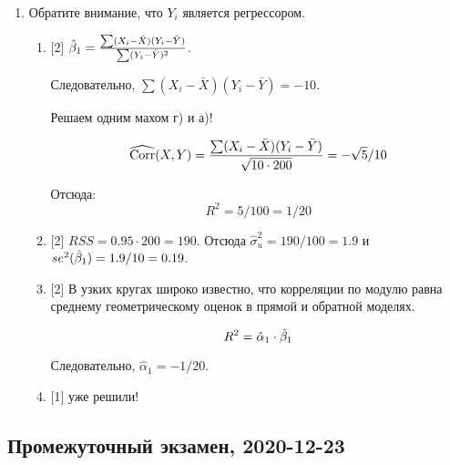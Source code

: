 \begin{enumerate}
\item Обратите внимание, что $Y_i$ является регрессором. 
\begin{enumerate}
    \item {[2]} $\hat{\beta}_1 = \frac{\sum (X_i - \bar X)(Y_i - \bar Y)}{\sum (Y_i - \bar Y)^2}$.

    Следовательно, $\sum (X_i - \bar X)(Y_i - \bar Y) = -10$. 

    Решаем одним махом г) и а)!

    \[
    \operatorname{\widehat{\operatorname{Corr}}}(X, Y) = \frac{\sum (X_i - \bar X)(Y_i - \bar Y)}{\sqrt{10\cdot 200}} = -\sqrt{5}/10    
    \]

    Отсюда:
    \[
    R^2 = 5/100 = 1/20   
    \]

    \item {[2]} $RSS = 0.95 \cdot 200 = 190$. Отсюда $\hat\sigma^2_u = 190/100 = 1.9$ и $se^2(\hat{\beta}_1) = 1.9/10=0.19$.
    \item {[2]} В узких кругах широко известно, что корреляции по модулю равна среднему геометрическому оценок 
    в прямой и обратной моделях. 

    \[
    R^2 = \hat\alpha_1 \cdot \hat{\beta}_1    
    \]

    Следовательно, $\hat\alpha_1 = -1/20$.

    \item {[1]} уже решили!
\end{enumerate}


\end{enumerate}
    



\subsection{Промежуточный экзамен, 2020-12-23}

